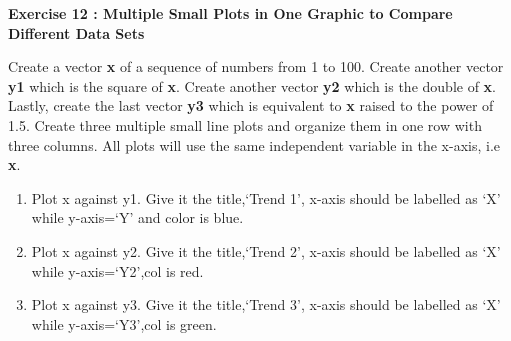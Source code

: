 \documentclass[
]{book}
\providecommand{\tightlist}{%
  \setlength{\itemsep}{0pt}\setlength{\parskip}{0pt}}
\begin{document}
\textbf{Exercise 12 : Multiple Small Plots in One Graphic to Compare Different Data Sets}

Create a vector \textbf{x} of a sequence of numbers from 1 to 100. Create another vector \textbf{y1} which is the square of \textbf{x}. Create another vector \textbf{y2} which is the double of \textbf{x}. Lastly, create the last vector \textbf{y3} which is equivalent to \textbf{x} raised to the power of 1.5. Create three multiple small line plots and organize them in one row with three columns. All plots will use the same independent variable in the x-axis, i.e \textbf{x}.

\begin{enumerate}
\def\labelenumi{\roman{enumi})}
\tightlist
\item
  Plot x against y1. Give it the title,`Trend 1', x-axis should be labelled as `X' while y-axis=`Y' and color is blue.
\item
  Plot x against y2. Give it the title,`Trend 2', x-axis should be labelled as `X' while y-axis=`Y2',col is red.
\item
  Plot x against y3. Give it the title,`Trend 3', x-axis should be labelled as `X' while y-axis=`Y3',col is green.
\end{enumerate}
\end{document}
